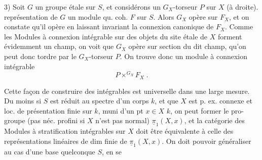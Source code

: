3) Soit $G$ un groupe  étale sur $S$, et considérons un $G_X$-torseur $P$ sur $X$ (à droite).   représentation de $G$  un module qu. coh. $F$ sur $S$. Alors $G_X$ opère sur $F_X$, et on constate qu'il opère en laissant invariant la connexion canonique de $F_X$. Comme les Modules à connexion intégrable  sur des objets du site étale de $X$ forment évidemment un champ, on voit que $G_X$  opère sur  section  du dit  champ, qu'on peut donc tordre par le $G_X$-torseur $P$. On trouve donc un module à connexion intégrable
\[
 P\mathbin{\times^{G_X}} F_X\; .
\]

Cette façon de construire des   intégrables est  universelle dans une large mesure.   Du moins si $S$ est réduit au spectre d'un corps $k$, et que $X$ est p. ex. connexe et  loc. de présentation finie sur $k$, muni d'un pt $x\in X$   $k$, on peut former le pro-groupe   (pas néc. profini si $X$ n'est pas normal) $\underline{\pi}_1(X,x)$, et la catégorie des Modules  à stratification intégrables sur $X$ doit être équivalente à celle des représentations linéaires de dim finie de $\underline{\pi}_1(X,x)$. On doit pouvoir généraliser au cas d'une base quelconque $S$, en se
